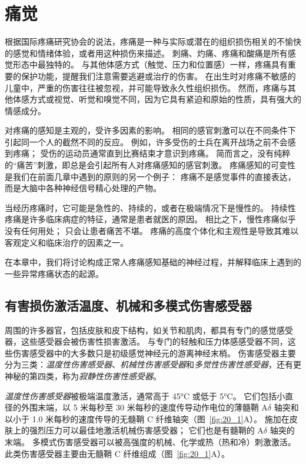 \chapter{痛觉} \label{chap:chap20}

根据国际疼痛研究协会的说法，疼痛是一种与实际或潜在的组织损伤相关的不愉快的感觉和情绪体验，或者用这种损伤来描述。
刺痛、灼痛、疼痛和酸痛是所有感觉形态中最独特的。
与其他体感方式（触觉、压力和位置感）一样，疼痛具有重要的保护功能，提醒我们注意需要逃避或治疗的伤害。 
在出生时对疼痛不敏感的儿童中，严重的伤害往往被忽视，并可能导致永久性组织损伤。
然而，疼痛与其他体感方式或视觉、听觉和嗅觉不同，因为它具有紧迫和原始的性质，具有强大的情感成分。





对疼痛的感知是主观的，受许多因素的影响。
相同的感官刺激可以在不同条件下引起同一个人的截然不同的反应。
例如，许多受伤的士兵在离开战场之前不会感到疼痛；
受伤的运动员通常直到比赛结束才意识到疼痛。
简而言之，没有纯粹的“痛苦”刺激，即总是会引起所有人对疼痛感知的感官刺激。
疼痛感知的可变性是我们在前面几章中遇到的原则的另一个例子：
疼痛不是感觉事件的直接表达，而是大脑中各种神经信号精心处理的产物。


当经历疼痛时，它可能是急性的、持续的，或者在极端情况下是慢性的。
持续性疼痛是许多临床病症的特征，通常是患者就医的原因。
相比之下，慢性疼痛似乎没有任何用处；
只会让患者痛苦不堪。
疼痛的高度个体化和主观性是导致其难以客观定义和临床治疗的因素之一。


在本章中，我们将讨论构成正常人疼痛感知基础的神经过程，并解释临床上遇到的一些异常疼痛状态的起源。



\section{有害损伤激活温度、机械和多模式伤害感受器}

周围的许多器官，包括皮肤和皮下结构，如关节和肌肉，都具有专门的感觉感受器，这些感受器会被伤害性损害激活。
与专门的轻触和压力体感感受器不同，这些伤害感受器中的大多数只是初级感觉神经元的游离神经末梢。
伤害感受器主要分为三类：\textit{温度性伤害感受器}、\textit{机械性伤害感受器}和\textit{多觉性伤害性感受器}，还有更神秘的第四类，称为\textit{寂静性伤害性感受器}。


\textit{温度性伤害感受器}被极端温度激活，通常高于 45°C 或低于 5°C。
它们包括小直径的外围末端，以 5 米每秒至 30 米每秒的速度传导动作电位的薄髓鞘 A$\delta$ 轴突和以小于 1.0 米每秒的速度传导的无髓鞘 C 纤维轴突（图~\ref{fig:20_1}A）。
施加在皮肤上的强烈压力可以最佳地激活机械伤害感受器；
它们也是有髓鞘的 A$\delta$ 轴突的末端。
多模式伤害感受器可以被高强度的机械、化学或热（热和冷）刺激激活。
此类伤害感受器主要由无髓鞘 C 纤维组成（图~\ref{fig:20_1}A）。


